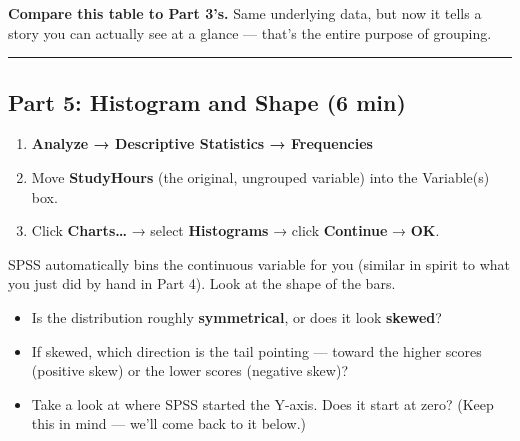 \documentclass[
  11pt,
]{article}
\providecommand{\tightlist}{%
  \setlength{\itemsep}{0pt}\setlength{\parskip}{0pt}}\usepackage{longtable,booktabs,array}
\begin{document}
\textbf{Compare this table to Part 3's.} Same underlying data, but now
it tells a story you can actually see at a glance --- that's the entire
purpose of grouping.

\begin{center}\rule{0.5\linewidth}{0.5pt}\end{center}

\subsection{Part 5: Histogram and Shape (6
min)}\label{part-5-histogram-and-shape-6-min}

\begin{enumerate}
\def\labelenumi{\arabic{enumi}.}
\tightlist
\item
  \textbf{Analyze → Descriptive Statistics → Frequencies}
\item
  Move \textbf{StudyHours} (the original, ungrouped variable) into the
  Variable(s) box.
\item
  Click \textbf{Charts\ldots{}} → select \textbf{Histograms} → click
  \textbf{Continue} → \textbf{OK}.
\end{enumerate}

SPSS automatically bins the continuous variable for you (similar in
spirit to what you just did by hand in Part 4). Look at the shape of the
bars.

\begin{tcolorbox}[enhanced jigsaw, toptitle=1mm, colbacktitle=quarto-callout-tip-color!10!white, bottomtitle=1mm, arc=.35mm, colback=white, leftrule=.75mm, toprule=.15mm, left=2mm, opacityback=0, coltitle=black, colframe=quarto-callout-tip-color-frame, titlerule=0mm, title=\textcolor{quarto-callout-tip-color}{\faLightbulb}\hspace{0.5em}{Checkpoint --- answer using your histogram}, breakable, rightrule=.15mm, opacitybacktitle=0.6, bottomrule=.15mm]

\begin{itemize}
\tightlist
\item
  Is the distribution roughly \textbf{symmetrical}, or does it look
  \textbf{skewed}?
\item
  If skewed, which direction is the tail pointing --- toward the higher
  scores (positive skew) or the lower scores (negative skew)?
\item
  Take a look at where SPSS started the Y-axis. Does it start at zero?
  (Keep this in mind --- we'll come back to it below.)
\end{itemize}

\end{tcolorbox}
\end{document}
